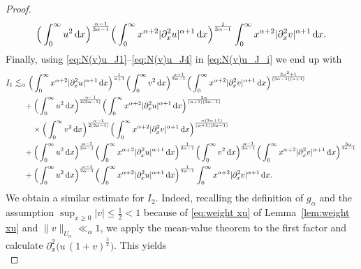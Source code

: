\documentclass[reqno,12pt]{amsart}
\renewcommand{\d}{\ensuremath{\mathrm{d}}}
\renewcommand{\d}{\ensuremath{{\rm d}}}
\numberwithin{equation}{section}
\begin{document}
\begin{proof}
\begin{equation}
    \Big(\int_0^\infty u^2\, \d x\Big)^\frac{\alpha-1}{3\alpha-1}
    \Big(\int_0^\infty x^{\alpha+2} |\partial_x^2 u|^{\alpha+1} \, \d x\Big)^\frac{1}{3\alpha-1}
    \int_0^\infty x^{\alpha+2} |\partial_x^2 v|^{\alpha+1}\, \d x.
\end{equation}
%
Finally, using \eqref{eq:N(v)u_J1}--\eqref{eq:N(v)u_J4} in \eqref{eq:N(v)u_J_i} we end up with
%
\begin{align}\nonumber
    I_1
    &\lesssim_\alpha
    \Big(\int_0^\infty x^{\alpha+2} |\partial_x^2 u|^{\alpha+1}\, \d x\Big)^\frac{1}{\alpha+1}
    \Big(\int_0^\infty v^2\, \d x\Big)^\frac{\alpha-1}{3\alpha-1}
    \Big(\int_0^\infty x^{\alpha+2} |\partial_x^2 v|^{\alpha+1}\, \d x\Big)^\frac{3\alpha^2+1}{(3\alpha-1)(\alpha+1)}
    \\
    &\phantom{\lesssim_\alpha}
    +
    \Big(\int_0^\infty
    u^2\, \d x
    \Big)^\frac{\alpha-1}{2(3\alpha-1)}
    \Big(\int_0^\infty
    x^{\alpha+2} |\partial_x^2 u|^{\alpha+1}\, \d x
    \Big)^\frac{2\alpha}{(\alpha+1)(3\alpha-1)} \nonumber \\
    &\phantom{\lesssim_\alpha +} \times \Big(\int_0^\infty
    v^2\, \d x
    \Big)^\frac{\alpha-1}{2(3\alpha-1)} 
    \Big(\int_0^\infty
    x^{\alpha+2} |\partial_x^2 v|^{\alpha+1}\, \d x
    \Big)^\frac{\alpha(3\alpha+1)}{(\alpha+1)(3\alpha-1)}
    \nonumber \\
    &\phantom{\lesssim_\alpha}
    +
    \Big(\int_0^\infty u^2\, \d x\Big)^\frac{\alpha-1}{3\alpha-1}
    \Big(\int_0^\infty x^{\alpha+2} |\partial_x^2 u|^{\alpha+1} \, \d x\Big)^\frac{1}{3\alpha-1}
    \Big(\int_0^\infty
    v^2\, \d x
    \Big)^\frac{\alpha-1}{3\alpha-1} 
    \Big(\int_0^\infty
    x^{\alpha+2} |\partial_x^2 v|^{\alpha+1}\, \d x
    \Big)^\frac{3\alpha}{3\alpha-1}
    \nonumber \\
    &\phantom{\lesssim_\alpha}
    +
    \Big(\int_0^\infty u^2\, \d x\Big)^\frac{\alpha-1}{3\alpha-1}
    \Big(\int_0^\infty x^{\alpha+2} |\partial_x^2 u|^{\alpha+1} \, \d x\Big)^\frac{1}{3\alpha-1}
    \int_0^\infty x^{\alpha+2} |\partial_x^2 v|^{\alpha+1}\, \d x. \label{eq:N(v)u_I1}
\end{align} 
%
We obtain a similar estimate for $I_2$. Indeed, recalling the definition of $g_\alpha$ and the assumption $\sup_{x\geq 0} |v| \leq \frac{1}{2} < 1$ because of \eqref{eq:weight xu} of Lemma~\ref{lem:weight xu} and $\|v\|_{U_\alpha} \ll_\alpha 1$, we  apply the mean-value theorem to the first factor and calculate $\partial^2_x\bigl(u\,  (1+v)^{\frac{3}{2}}\bigr)$. This yields
%
\begin{equation*}

\end{equation*}
\end{proof}
\end{document}
